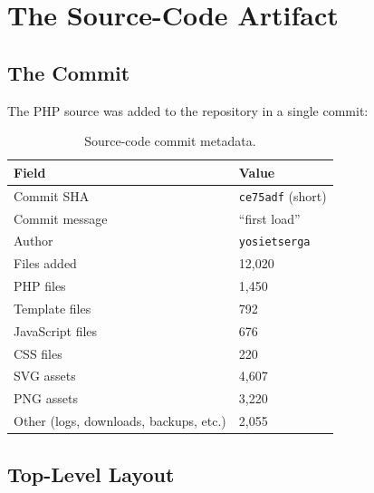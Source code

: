 \documentclass[11pt,a4paper]{article}
\begin{document}
\section{The Source-Code Artifact}\label{sec:artifact}

\subsection{The Commit}

The PHP source was added to the repository in a single commit:

\begin{table}[htbp]
\centering
\caption{Source-code commit metadata.}\label{tab:source-commit}
\small
\begin{tabularx}{\columnwidth}{lX}
\toprule
\textbf{Field} & \textbf{Value} \\
\midrule
Commit SHA      & \texttt{ce75adf} (short) \\
Commit message  & ``first load'' \\
Author          & \texttt{yosietserga} \\
Files added     & 12,020 \\
PHP files       & 1,450 \\
Template files  & 792 \\
JavaScript files & 676 \\
CSS files       & 220 \\
SVG assets      & 4,607 \\
PNG assets      & 3,220 \\
Other (logs, downloads, backups, etc.) & 2,055 \\
\bottomrule
\end{tabularx}
\end{table}

\subsection{Top-Level Layout}
\end{document}

